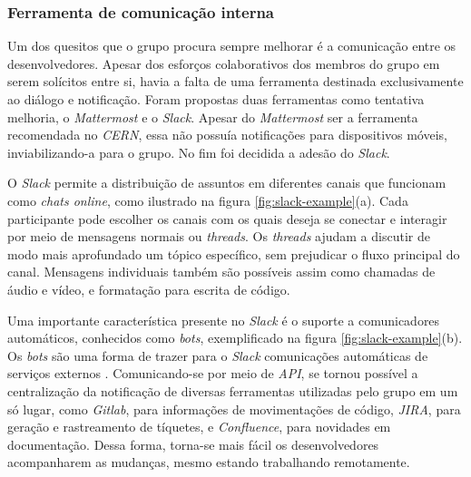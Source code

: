 \hypertarget{ferramenta-de-comunicacao-interna}{%
\subsubsection{Ferramenta de comunicação interna}\label{ferramenta-de-comunicacao-interna}}

Um dos quesitos que o grupo procura sempre melhorar é a comunicação entre os desenvolvedores. Apesar dos esforços colaborativos dos membros do grupo em serem solícitos entre si, havia a falta de uma ferramenta destinada exclusivamente ao diálogo e notificação. Foram propostas duas ferramentas como tentativa melhoria, o \emph{Mattermost} e o \emph{Slack}. Apesar do \emph{Mattermost} ser a ferramenta recomendada no \emph{CERN}, essa não possuía notificações para dispositivos móveis, inviabilizando-a para o grupo. No fim foi decidida a adesão do \emph{Slack}.

O \emph{Slack} permite a distribuição de assuntos em diferentes canais que funcionam como \emph{chats online}, como ilustrado na figura \ref{fig:slack-example}(a). Cada participante pode escolher os canais com os quais deseja se conectar e interagir por meio de mensagens normais ou \emph{threads}. Os \emph{threads} ajudam a discutir de modo mais aprofundado um tópico específico, sem prejudicar o fluxo principal do canal. Mensagens individuais também são possíveis assim como chamadas de áudio e vídeo, e formatação para escrita de código.

Uma importante característica presente no \emph{Slack} é o suporte a comunicadores automáticos, conhecidos como \emph{bots}, exemplificado na figura \ref{fig:slack-example}(b). Os \emph{bots} são uma forma de trazer para o \emph{Slack} comunicações automáticas de serviços externos . Comunicando-se por meio de \emph{API}, se tornou possível a centralização da notificação de diversas ferramentas utilizadas pelo grupo em um só lugar, como \emph{Gitlab}, para informações de movimentações de código, \emph{JIRA}, para geração e rastreamento de tíquetes, e \emph{Confluence}, para novidades em documentação. Dessa forma, torna-se mais fácil os desenvolvedores acompanharem as mudanças, mesmo estando trabalhando remotamente.

